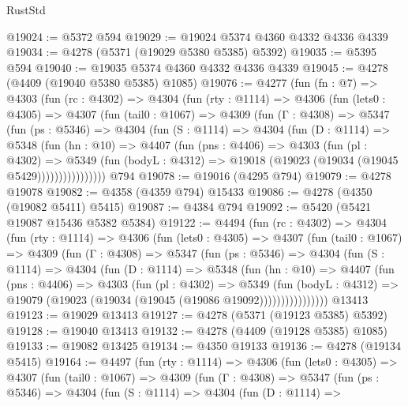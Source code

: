 \begin{lexlean}{RustStd}
\begin{coremodule}
@19024 := @5372 @594
@19029 := @19024 @5374 @4360 @4332 @4336 @4339
@19034 := @4278 (@5371 (@19029 @5380 @5385) @5392)
@19035 := @5395 @594
@19040 := @19035 @5374 @4360 @4332 @4336 @4339
@19045 := @4278 (@4409 (@19040 @5380 @5385) @1085)
@19076 := @4277
    (fun (fn : @7) =>
    @4303
      (fun (rc : @4302) =>
      @4304
        (fun (rty : @1114) =>
        @4306
          (fun (lets0 : @4305) =>
          @4307
            (fun (tail0 : @1067) =>
            @4309
              (fun (Γ : @4308) =>
              @5347
                (fun (ps : @5346) =>
                @4304
                  (fun (S : @1114) =>
                  @4304
                    (fun (D : @1114) =>
                    @5348
                      (fun (hn : @10) =>
                      @4407
                        (fun (pns : @4406) =>
                        @4303
                          (fun (pl : @4302) =>
                          @5349
                            (fun (bodyL : @4312) =>
                            @19018 (@19023 (@19034 (@19045 @5429))))))))))))))))
    @794
@19078 := @19016 (@4295 @794)
@19079 := @4278 @19078
@19082 := @4358 (@4359 @794) @15433
@19086 := @4278 (@4350 (@19082 @5411) @5415)
@19087 := @4384 @794
@19092 := @5420 (@5421 @19087 @15436 @5382 @5384)
@19122 := @4494
    (fun (rc : @4302) =>
    @4304
      (fun (rty : @1114) =>
      @4306
        (fun (lets0 : @4305) =>
        @4307
          (fun (tail0 : @1067) =>
          @4309
            (fun (Γ : @4308) =>
            @5347
              (fun (ps : @5346) =>
              @4304
                (fun (S : @1114) =>
                @4304
                  (fun (D : @1114) =>
                  @5348
                    (fun (hn : @10) =>
                    @4407
                      (fun (pns : @4406) =>
                      @4303
                        (fun (pl : @4302) =>
                        @5349
                          (fun (bodyL : @4312) =>
                          @19079 (@19023 (@19034 (@19045 (@19086 @19092))))))))))))))))
    @13413
@19123 := @19029 @13413
@19127 := @4278 (@5371 (@19123 @5385) @5392)
@19128 := @19040 @13413
@19132 := @4278 (@4409 (@19128 @5385) @1085)
@19133 := @19082 @13425
@19134 := @4350 @19133
@19136 := @4278 (@19134 @5415)
@19164 := @4497
    (fun (rty : @1114) =>
    @4306
      (fun (lets0 : @4305) =>
      @4307
        (fun (tail0 : @1067) =>
        @4309
          (fun (Γ : @4308) =>
          @5347
            (fun (ps : @5346) =>
            @4304
              (fun (S : @1114) =>
              @4304
                (fun (D : @1114) =>

\end{coremodule}
\end{lexlean}
